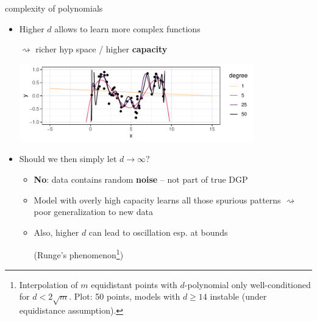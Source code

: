 \documentclass[11pt,compress,t,notes=noshow, xcolor=table]{beamer}
\begin{document}
\begin{frame}{complexity of polynomials}

\begin{itemize}
  \item Higher $d$ allows to learn more complex functions 
  
  $\rightsquigarrow$ richer hyp space / higher \textbf{capacity}
  
  \vfill
  \includegraphics[width=0.8\textwidth]{figure/reg_poly_univ_4}
  \item Should we then simply let $d \rightarrow \infty$?
  \begin{itemize}
    \item \textbf{No}: data contains random \textbf{noise} -- not part of true
    DGP
    \item Model with overly high capacity learns all those spurious patterns
    $\rightsquigarrow$ poor generalization to new data
    \item Also, higher $d$ can lead to oscillation esp. at bounds 
    
    (Runge's phenomenon\footnote[frame]{\scriptsize
    Interpolation of $m$ equidistant points with $d$-polynomial only 
    well-conditioned for $d < 2 \sqrt{m}$. Plot: 50 points, models with $d \geq
    14$ instable (under equidistance assumption).
    })
    \vfill
  \end{itemize}
\end{itemize}

\end{frame}


\end{document}
